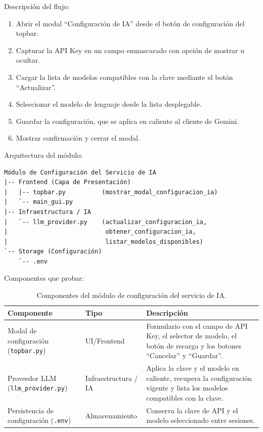 \documentclass[11pt]{article}
\begin{document}
Descripción del flujo:
\begin{enumerate}
    \item Abrir el modal ``Configuración de IA'' desde el botón de configuración del topbar.
    \item Capturar la API Key en un campo enmascarado con opción de mostrar u ocultar.
    \item Cargar la lista de modelos compatibles con la clave mediante el botón ``Actualizar''.
    \item Seleccionar el modelo de lenguaje desde la lista desplegable.
    \item Guardar la configuración, que se aplica en caliente al cliente de Gemini.
    \item Mostrar confirmación y cerrar el modal.
\end{enumerate}

Arquitectura del módulo:
\begin{verbatim}
Módulo de Configuración del Servicio de IA
|-- Frontend (Capa de Presentación)
|   |-- topbar.py          (mostrar_modal_configuracion_ia)
|   `-- main_gui.py
|-- Infraestructura / IA
|   `-- llm_provider.py    (actualizar_configuracion_ia,
|                           obtener_configuracion_ia,
|                           listar_modelos_disponibles)
`-- Storage (Configuración)
    `-- .env
\end{verbatim}

Componentes que probar:

\begin{table}[H]
    \centering
    \begin{tabular}{|L{0.34\textwidth}|L{0.18\textwidth}|L{0.38\textwidth}|}
        \hline
        \textbf{Componente} & \textbf{Tipo} & \textbf{Descripción} \\ \hline
        Modal de configuración (\texttt{topbar.py}) & UI/Frontend & Formulario con el campo de API Key, el selector de modelo, el botón de recarga y los botones ``Cancelar'' y ``Guardar''. \\ \hline
        Proveedor LLM (\texttt{llm\_provider.py}) & Infraestructura / IA & Aplica la clave y el modelo en caliente, recupera la configuración vigente y lista los modelos compatibles con la clave. \\ \hline
        Persistencia de configuración (\texttt{.env}) & Almacenamiento & Conserva la clave de API y el modelo seleccionado entre sesiones. \\ \hline
    \end{tabular}
    \caption{Componentes del módulo de configuración del servicio de IA.}
    \label{tab:componentes-modulo-config}
\end{table}
\end{document}
